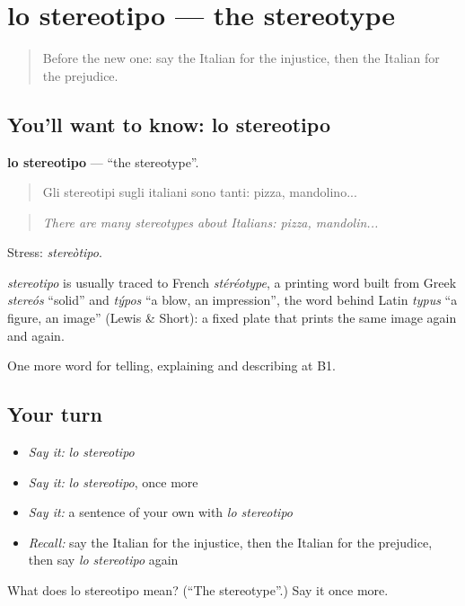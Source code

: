 \section[lo stereotipo]{lo stereotipo — the stereotype}

\label{lesson:IT-C365-stereotipo}



\begin{quote}
Before the new one: say the Italian for the injustice, then the Italian for the prejudice.
\end{quote}

\subsection*{You'll want to know: lo stereotipo}
\textbf{lo stereotipo} — \textquotedblleft{}the stereotype\textquotedblright{}.

\begin{quote}
Gli stereotipi sugli italiani sono tanti: pizza, mandolino...
\end{quote}

\begin{quote}
\emph{There are many stereotypes about Italians: pizza, mandolin...}
\end{quote}

Stress: \emph{stereòtipo}.

\begin{cousinweb}
\emph{stereotipo} is usually traced to French \emph{stéréotype}, a printing word built from Greek \emph{stereós} \textquotedblleft{}solid\textquotedblright{} and \emph{týpos} \textquotedblleft{}a blow, an impression\textquotedblright{}, the word behind Latin \emph{typus} \textquotedblleft{}a figure, an image\textquotedblright{} (Lewis \& Short): a fixed plate that prints the same image again and again.
\end{cousinweb}

\begin{grammarlens}[title={What you've built}]
One more word for telling, explaining and describing at B1.
\end{grammarlens}

\subsection*{Your turn}
\begin{itemize}
\raggedright
  \item \emph{Say it:} \emph{lo stereotipo}
  \item \emph{Say it:} \emph{lo stereotipo}, once more
  \item \emph{Say it:} a sentence of your own with \emph{lo stereotipo}
  \item \emph{Recall:} say the Italian for the injustice, then the Italian for the prejudice, then say \emph{lo stereotipo} again
\end{itemize}

\begin{tcolorbox}[breakable,colback=teal!4,colframe=teal!35!black,title={Before you move on}]
What does lo stereotipo mean? (\textquotedblleft{}The stereotype\textquotedblright{}.) Say it once more.
\end{tcolorbox}
